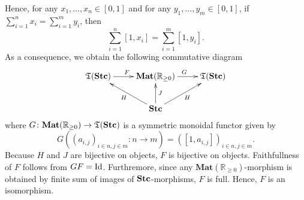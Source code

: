 Hence, for any $x_{1},\ldots,x_{n} \in [0,1]$
and for any $y_{1},\ldots,y_{m} \in [0,1]$,
if $\sum_{i = 1}^{n}x_{i} = \sum_{i = 1}^{m}y_{i}$,
then
\begin{equation*}
  \sum_{i = 1}^{n}[1,x_{i}] = \sum_{i = 1}^{m}[1,y_{i}].
\end{equation*}
As a consequence, we obtain the following
commutative diagram
\begin{equation*}
  \xymatrix{
    \mathfrak{T}(\Stc) \ar[r]^{F} &
    \mathbf{Mat}(\mathbb{R}_{\geq 0}) \ar[r]^{G} & \mathfrak{T}(\Stc) \\
    & \Stc \ar[lu]^{H} \ar[u]_{J} \ar[ru]_{H} &
  }
\end{equation*}
where $G \colon \mathbf{Mat}(\mathbb{R}_{\geq 0}) \to \mathfrak{T}(\mathbf{Stc})$
is a symmetric monoidal functor given by
\begin{equation*}
  G((a_{i,j})_{i \in n, j \in m} \colon n \to m) =
  ([1,a_{i,j}])_{i \in n, j \in m}.
\end{equation*}
Because $H$ and $J$ are bijective on objects,
$F$ is bijective on objects. Faithfullness of $F$
follows from $GF=\mbox{\normalfont Id}$. Furthremore,
since any $\mathbf{Mat}(\mathbb{R}_{\geq 0})$-morphism
is obtained by finite sum of images of $\mathbf{Stc}$-morphisms,
$F$ is full. Hence, $F$ is an isomorphism.




